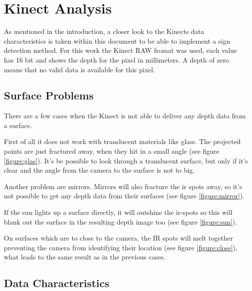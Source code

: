 \chapter{Kinect Analysis}
\graphicspath{{./KinectData/img/}}

As mentioned in the introduction, a closer look to the Kinects data characteristics is taken
within this document to be able to implement a sign detection method. 
For this work the Kinect RAW fromat was used, each value has 16 bit and shows the
depth for the pixel in millimeters. A depth of zero means that no valid data is available for
this pixel.

\section{Surface Problems}

There are a few cases when the Kinect is not able to deliver any depth data from a surface.

First of all it does not work with translucent materials like glass. The projected
points are just fractured away, when they hit in a small angle (see figure \vref{figure:glas}). 
It's be possible to look through a translucent surface, but only if it's clear and the angle from the 
camera to the surface is not to big.

Another problem are mirrors. Mirrors will also fracture the ir spots away, 
so it's not possible to get any depth data from their surfaces (see figure \vref{figure:mirror}).

If the sun lights up a surface directly, it will outshine the ir-spots so this will blank out the surface
in the resulting depth image too (see figure \vref{figure:sun}).

On surfaces which are to close to the camera, the IR spots will melt together preventing the camera from
identifying their location (see figure \vref{figure:close}), what leads to the same result as in the previous cases.

\section{Data Characteristics} 

